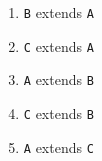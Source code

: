 \documentclass[oneside,11pt,dvipsnames]{book}
\newcommand{\code}[1]{\texttt{#1}}
\begin{document}
\begin{enumerate}
    \item \code{B} extends \code{A}
    \item \code{C} extends \code{A}
    \item \code{A} extends \code{B}
    \item \code{C} extends \code{B}
    \item \code{A} extends \code{C}
\end{enumerate}
\end{document}
